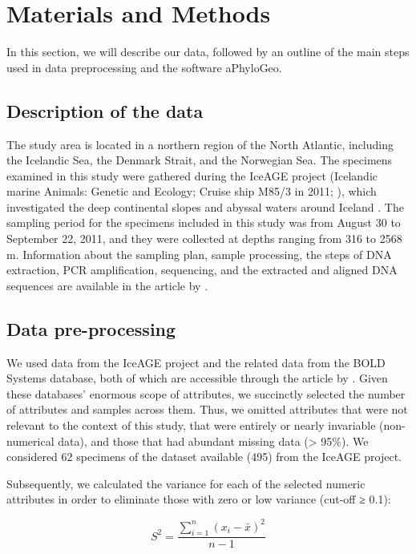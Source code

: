 \section{Materials and Methods}\label{materials-methods}
In this section, we will describe our data, followed by an outline of the main steps used in data preprocessing and the software aPhyloGeo. 

\subsection{Description of the data}
The study area is located in a northern region of the North Atlantic, including the Icelandic Sea, the Denmark Strait, and the Norwegian Sea. The specimens examined in this study were gathered during the IceAGE project (Icelandic marine Animals: Genetic and Ecology; Cruise ship M85/3 in 2011; \cite{brix_iceage_2014}), which investigated the deep continental slopes and abyssal waters around Iceland \citep{meisner_prefacebiodiversity_2018}. The sampling period for the specimens included in this study was from August 30 to September 22, 2011, and they were collected at depths ranging from 316 to 2568 m.  Information about the sampling plan, sample processing, the steps of DNA extraction, PCR amplification, sequencing, and the extracted and aligned DNA sequences are available in the article by \cite{uhlir_adding_2021}.

\subsection{Data pre-processing}
We used data from the IceAGE project and the related data from the BOLD Systems database, both of which are accessible through the article by \cite{uhlir_adding_2021}. Given these databases’ enormous scope of attributes, we succinctly selected the number of attributes and samples across them. Thus, we omitted attributes that were not relevant to the context of this study, that were entirely or nearly invariable (non-numerical data), and those that had abundant missing data (> 95\%). We considered 62 specimens of the dataset available (495) from the IceAGE project.

Subsequently, we calculated the variance for each of the selected numeric attributes in order to eliminate those with zero or low variance (cut-off ≥ 0.1):

\begin{equation}
    S^2 = \frac{\sum_{i=1}^{n} (x_i - \bar{x})^2}{n-1}
\end{equation}

